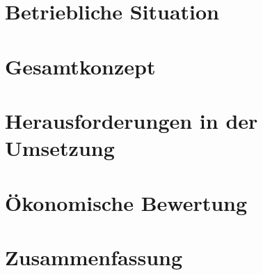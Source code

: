 \documentclass[11pt]{scrartcl}
\begin{document}
\section{Betriebliche Situation}
\Blindtext


\section{Gesamtkonzept}
\Blindtext

\section{Herausforderungen in der Umsetzung}
\Blindtext

\section{Ökonomische Bewertung}
\Blindtext

\section{Zusammenfassung}
\Blindtext
\end{document}
